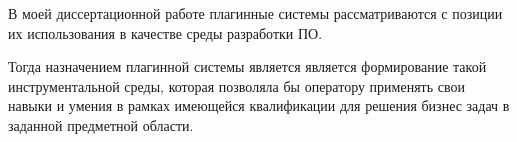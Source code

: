 
В моей диссертационной работе плагинные системы рассматриваются с позиции их использования в качестве среды разработки ПО.

Тогда назначением плагинной системы является является формирование такой инструментальной среды, которая позволяла бы оператору применять свои навыки и умения в рамках имеющейся квалификации для решения бизнес задач в заданной предметной области.